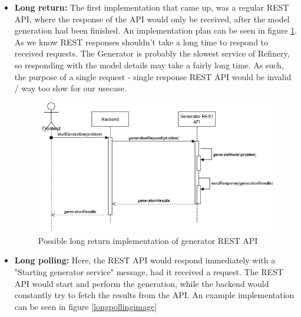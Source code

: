 \begin{itemize}
        \item \textbf{Long return:}
		The first implementation that came up, was a regular REST API, where the response of the API would only be received, after
		the model generation had been finished. An implementation plan can be seen in figure \ref{longreturnimage}. 
		As we know REST responses shouldn't take a long time to respond to received requests.
		The Generator is probably the slowest service of Refinery, so responding with the model details may take a fairly long time.
		As such, the purpose of a single request - single response REST API would be invalid / way too slow for our usecase.
		\begin{figure}
			\begin{center}
				\includegraphics[scale=0.6]{include/imgs/rest_long_return.png}
				\caption{Possible long return implementation of generator REST API}
				\label{longreturnimage}
			\end{center}
		\end{figure}
		\item \textbf{Long polling:}
		Here, the REST API would respond immediately with a "Starting generator service" message, had it received a request.
		The REST API would start and perform the generation, while the backend would constantly try to fetch the results from the API.
		An example implementation can be seen in figure \ref{longpollingimage}
		\begin{figure}
			\begin{center}

\end{center}
\end{figure}
\end{itemize}
